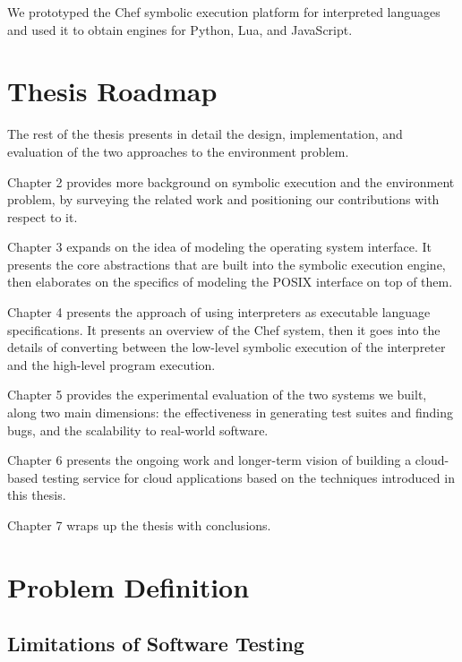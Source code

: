 We prototyped the Chef symbolic execution platform for interpreted languages and used it to obtain engines for Python, Lua, and JavaScript.


\section{Thesis Roadmap}

The rest of the thesis presents in detail the design, implementation, and evaluation of the two approaches to the environment problem.

Chapter 2 provides more background on symbolic execution and the environment problem, by surveying the related work and positioning our contributions with respect to it.

Chapter 3 expands on the idea of modeling the operating system interface.  It presents the core abstractions that are built into the symbolic execution engine, then elaborates on the specifics of modeling the POSIX interface on top of them.

Chapter 4 presents the approach of using interpreters as executable language specifications.  It presents an overview of the Chef system, then it goes into the details of converting between the low-level symbolic execution of the interpreter and the high-level program execution.

Chapter 5 provides the experimental evaluation of the two systems we built, along two main dimensions: the effectiveness in generating test suites and finding bugs, and the scalability to real-world software.

Chapter 6 presents the ongoing work and longer-term vision of building a cloud-based testing service for cloud applications based on the techniques introduced in this thesis.

Chapter 7 wraps up the thesis with conclusions.


\iffalse
\section{Problem Definition}

\subsection{Limitations of Software Testing}

